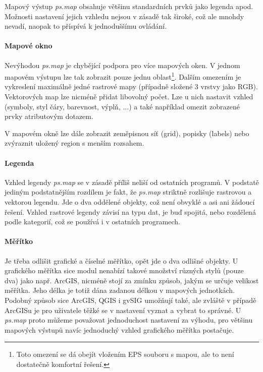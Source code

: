 \documentclass[a4paper,12pt,draft]{article}
\newcommand{\modul}[1]{\emph{#1}}
\begin{document}
Mapový výstup \modul{ps.map} obsahuje většinu standardních prvků jako legenda apod. Možnosti nastavení jejich vzhledu nejsou v zásadě tak široké, což ale mnohdy nevadí, naopak to příspívá k jednoduššímu ovládání.

\paragraph*{Mapové okno}
Nevýhodou \modul{ps.map} je chybějící podpora pro více mapových oken. V jednom mapovém výstupu lze tak zobrazit pouze jednu oblast\footnote{Toto omezení se dá obejít vložením EPS souboru s mapou, ale to není dostatečně komfortní řešení.}. Dalším omezením je vykreslení maximálně jedné rastrové mapy (případně složené 3 vrstvy jako RGB). Vektorových map lze nicméně přidat libovolný počet. Lze u nich nastavit vzhled (symboly, styl čáry, barevnost, výplň, ...) a také například omezit zobrazené prvky atributovým dotazem. 

V mapovém okně lze dále zobrazit zeměpisnou síť (grid), popisky (labels) nebo zvýraznit uložený region s menším rozsahem.

\paragraph*{Legenda}
Vzhled legendy \modul{ps.map} se v zásadě příliš neliší od ostatních programů. V podstatě jediným podstatnějším rozdílem je fakt, že \modul{ps.map} striktně rozlišuje rastrovou a vektorou legendu. Jde o dva oddělené objekty, což není obvyklé a asi ani žádoucí řešení. Vzhled rastrové legendy závisí na typu dat, je buď spojitá, nebo rozdělená podle kategorií, což se používá i v ostatních programech.

\paragraph*{Měřítko}
Je třeba odlišit grafické a číselné měřítko, opět jde o dva odlišné objekty.
U grafického měřítka sice modul nenabízí takové množství různých stylů (pouze dva) jako např. ArcGIS, nicméně stojí za zmínku způsob, jakým se určuje velikost měřítka. Jeho délka je totiž dána zadanou délkou v mapových jednotkách. Podobný způsob sice ArcGIS, QGIS i gvSIG umožňují také, ale zvláště v případě ArcGISu je pro uživatele těžké se v nastavení vyznat a vybrat to správné. U \modul{ps.map} proto můžeme považovat jednoduchost nastavení za výhodu, pro většinu mapových výstupů navíc jednoduchý vzhled grafického měřítka postačuje.
\end{document}
